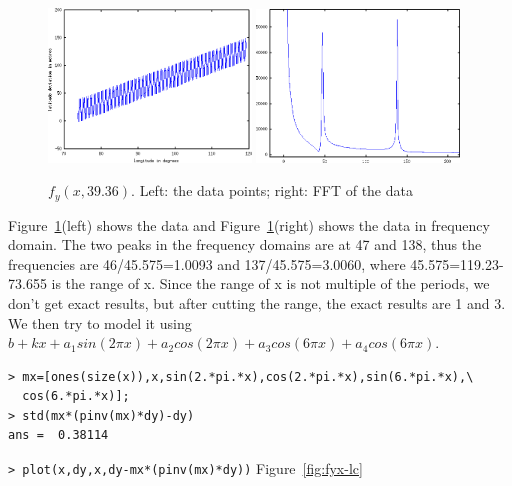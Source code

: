 \documentclass[a4paper]{article}
\begin{document}
\begin{figure}[htb]
\begin{center}
\includegraphics[width=0.48\textwidth]{fyx-data.png}
\includegraphics[width=0.48\textwidth]{fyx-fft.png}
\end{center}
\caption{$f_y(x,39.36)$. Left: the data points; right: FFT of the data}
\label{fig:fyx-fft}
\end{figure}

Figure~\ref{fig:fyx-fft}(left) shows the data and
Figure~\ref{fig:fyx-fft}(right) shows the data in frequency domain.
The two peaks in the frequency domains are at 47 and 138,
thus the frequencies are 46/45.575=1.0093 and 137/45.575=3.0060, where
45.575=119.23-73.655 is the range of x.
Since the range of x is not multiple of the periods, we don't get exact
results, but after cutting the range, the exact results are 1 and 3.
We then try to model it using $b+kx+a_1sin(2\pi x)+a_2cos(2\pi x)+a_3cos(6\pi
x)+a_4cos(6\pi x)$.

\begin{verbatim}
> mx=[ones(size(x)),x,sin(2.*pi.*x),cos(2.*pi.*x),sin(6.*pi.*x),\
  cos(6.*pi.*x)];
> std(mx*(pinv(mx)*dy)-dy)
ans =  0.38114
\end{verbatim}
\verb|> plot(x,dy,x,dy-mx*(pinv(mx)*dy))| \hfill Figure~\ref{fig:fyx-lc}
\end{document}
